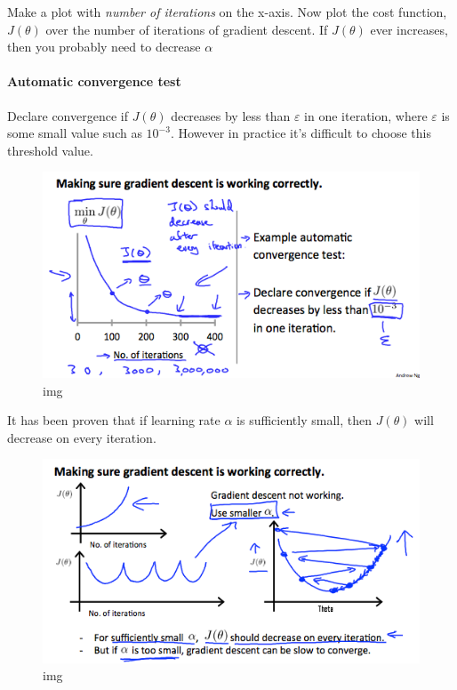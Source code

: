 \documentclass[11pt]{article}
\makeatletter
\def\maxwidth{\ifdim\Gin@nat@width>\linewidth\linewidth
    \else\Gin@nat@width\fi}
\let\Oldincludegraphics\includegraphics
\renewcommand{\includegraphics}[1]{\Oldincludegraphics[width=.8\maxwidth]{#1}}
\makeatother
\begin{document}
Make a plot with \emph{number of iterations} on the x-axis. Now plot the
cost function, \(J(θ)\) over the number of iterations of gradient
descent. If \(J(θ)\) ever increases, then you probably need to decrease
\(\alpha\)

\hypertarget{automatic-convergence-test}{%
\paragraph{Automatic convergence
test}\label{automatic-convergence-test}}

Declare convergence if \(J(θ)\) decreases by less than \(\varepsilon\)
in one iteration, where \(\varepsilon\) is some small value such as
\(10^{−3}\). However in practice it's difficult to choose this threshold
value.

\begin{figure}
\centering
\includegraphics{./assets/FEfS3aajEea3qApInhZCFg_6be025f7ad145eb0974b244a7f5b3f59_Screenshot-2016-11-09-09.35.59.png}
\caption{img}
\end{figure}

It has been proven that if learning rate \(\alpha\) is sufficiently
small, then \(J(θ)\) will decrease on every iteration.

\begin{figure}
\centering
\includegraphics{./assets/rC2jGKgvEeamBAoLccicqA_ec9e40a58588382f5b6df60637b69470_Screenshot-2016-11-11-08.55.21.png}
\caption{img}
\end{figure}
\end{document}
